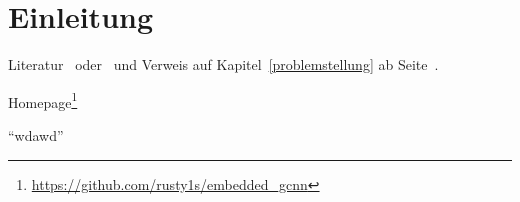 \chapter{Einleitung}
\label{einleitung}

Literatur~\cite{Abramowski:1991} oder~\cite{Abramowski:1991, Muller:2011}
und Verweis auf Kapitel~\ref{problemstellung} ab Seite~\pageref{aufbau_der_arbeit}.

Homepage\footnote{\url{https://github.com/rusty1s/embedded\_gcnn}}

\enquote{wdawd}
